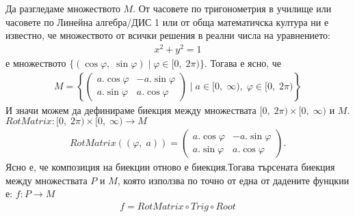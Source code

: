 \documentclass[a4paper, 12pt, oneside]{article}
\begin{document}
Да разгледаме множеството $M$. От часовете по тригонометрия в училище или часовете по Линейна алгебра/ДИС 1
или от обща математичска култура ни е известно, че множеството от всички решения в реални числа на уравнението:
\begin{align*}
    x^2 + y^2 = 1
\end{align*}
е множеството $\{(\cos\varphi, \; \sin\varphi) \; | \; \varphi \in [0, \; 2\pi)\}$.
Тогава е ясно, че
\begin{align*}
    M = \left\{\begin{pmatrix}
    a.\cos\varphi & -a.\sin\varphi \\
    a.\sin\varphi & a.\cos\varphi
\end{pmatrix} \; \Big | \; a \in [0, \; \infty), \; \varphi \in [0, \; 2\pi) \right\}
\end{align*}
И значи можем да дефинираме биекция между множествата $[0, \; 2\pi) \times [0, \; \infty)$ и $M$.
$RotMatrix : [0, \; 2\pi) \times [0, \; \infty) \to M$
\begin{align*}
    RotMatrix((\varphi, \; a)) = \begin{pmatrix}
        a.\cos\varphi & -a.\sin\varphi \\
        a.\sin\varphi & a.\cos\varphi
    \end{pmatrix}.
\end{align*}
Ясно е, че композиция на биекции отново е биекция.Тогава търсената биекция между множествата $P$ и $M$,
която използва по точно от една от дадените фунцкии е: $f : P \to M$
\begin{align*}
    f = RotMatrix \circ Trig \circ Root
\end{align*}
\end{document}
